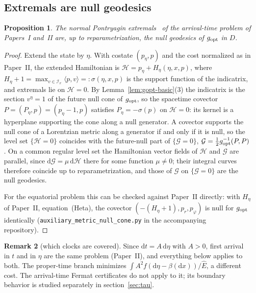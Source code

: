 \documentclass[aip,jmp,amsmath,amssymb,reprint]{revtex4-2}
\newcommand{\Ehat}{\hat E}
\newcommand{\dd}{\mathrm{d}}
\newcommand{\gopt}{g_{\rm opt}}
\theoremstyle{plain}
\newtheorem{proposition}{Proposition}[section]
\theoremstyle{definition}
\newtheorem{remark}[proposition]{Remark}
\begin{document}
\subsection{Extremals are null geodesics}
\begin{proposition}\label{prop:extremals}
The normal Pontryagin extremals~\cite[section~4.1]{Liberzon} of the arrival-time problem of Papers~I and~II are, up
to reparametrization, the null geodesics of $\gopt$ in $D$.
\end{proposition}

\begin{proof}
Extend the state by $\eta$. With costate $(p_\eta,p)$ and the cost normalized as in
Paper~II, the extended Hamiltonian is $\mathcal H=p_\eta+H_\eta(\eta,x,p)$, where
$H_\eta+1=\max_{v\in\mathcal I_x}\langle p,v\rangle=:\sigma(\eta,x,p)$ is the support
function of the indicatrix, and extremals lie on $\mathcal H=0$. By
Lemma~\ref{lem:gopt-basic}(3) the indicatrix is the section $v^\eta=1$ of the future
null cone of $\gopt$, so the spacetime covector
$P=(P_\eta,p)=(p_\eta-1,p)$ satisfies $P_\eta=-\sigma(p)$ on $\mathcal H=0$: its kernel
is a hyperplane supporting the cone along a null generator. A covector supports the
null cone of a Lorentzian metric along a generator if and only if it is null, so the
level set $\{\mathcal H=0\}$ coincides with the future-null part of
$\{\mathcal G=0\}$, $\mathcal G=\frac12\gopt^{-1}(P,P)$. On a common regular level set the
Hamiltonian vector fields of $\mathcal H$ and $\mathcal G$ are parallel, since
$\dd\mathcal G=\mu\,\dd\mathcal H$ there for some function $\mu\neq0$; their integral curves
therefore coincide up to reparametrization, and those of $\mathcal G$ on
$\{\mathcal G=0\}$ are the null geodesics.

For the equatorial problem this can be checked against Paper~II directly: with
$H_\eta$ of Paper~II, equation~(Heta), the covector $(-(H_\eta+1),p_r,p_\varphi)$ is null
for $\gopt$ identically (\texttt{auxiliary\_metric\_null\_cone.py} in the accompanying repository).
\end{proof}

\begin{remark}[which clocks are covered]\label{rmk:clocks}
Since $\dd t=A\,\dd\eta$ with $A>0$, first arrival in $t$ and in $\eta$ are the same
problem (Paper~II), and everything below applies to both. The proper-time branch
minimizes $\int A^2f(\dd\eta-\beta(\dd x))/\Ehat$, a different cost. The arrival-time
Fermat certificates do not apply to it; its boundary behavior is studied separately in
section~\ref{sec:tau}.
\end{remark}
\end{document}
